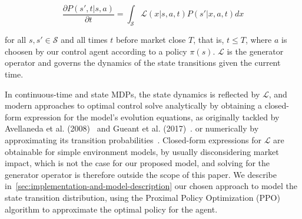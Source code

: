 \begin{equation}
    \label{eq:equation2}
    \frac{\partial P(s', t | s, a)}{\partial t}  = \int_{\mathcal{S}} \mathcal{L}(x | s, a, t) P(s'| x, a, t) dx
\end{equation}

for all $s, s' \in \mathcal{S}$ and all times $t$ before market close $T$, that is, $t \le T$,
where $a$ is choosen by our control agent according to a policy $\pi (s)$.
$\mathcal{L}$ is the generator operator and governs the dynamics of the state transitions given the current time.

In continuous-time and state MDPs, the state dynamics is reflected by $\mathcal{L}$, and modern approaches to optimal control
solve analytically by obtaining a closed-form expression for the model's evolution equations, as originally tackled by
Avellaneda et al. (2008)~\cite{Avellaneda2008} and Gueant et al. (2017)~\cite{Gueant2017}.
or numerically by approximating its transition probabilities~\cite{Gueant2022, Selser2021a, FalcesMarin2022}.
Closed-form expressions for $\mathcal{L}$ are obtainable for simple environment models, by usually disconsidering market impact,
which is not the case for our proposed model, and solving for the generator operator is therefore outside the scope of this paper.
We describe in~\autoref{sec:implementation-and-model-description} our chosen approach to model the state transition distribution,
using the Proximal Policy Optimization (PPO) algorithm to approximate the optimal policy for the agent.
